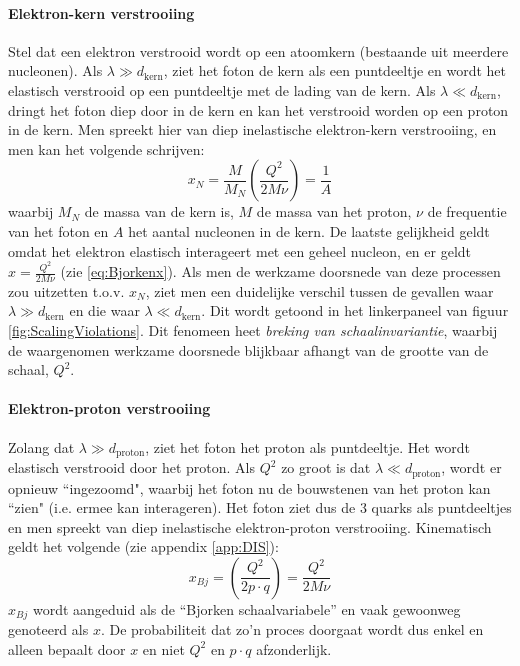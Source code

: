 \documentclass[a4paper,11pt]{article}
\numberwithin{equation}{section} %
\begin{document}
    \paragraph{Elektron-kern verstrooiing}
Stel dat een elektron verstrooid wordt op een atoomkern (bestaande uit meerdere nucleonen).
Als $\lambda \gg d_\text{kern}$, ziet het foton de kern als een puntdeeltje en wordt het elastisch verstrooid op een puntdeeltje met de lading van de kern.
Als $\lambda \ll d_\text{kern}$, dringt het foton diep door in de kern en kan het verstrooid worden op een proton in de kern.
Men spreekt hier van diep inelastische elektron-kern verstrooiing, en men kan het volgende schrijven:
\begin{equation}
x_N = \frac{M}{M_N} \left( \frac{Q^2}{2M\nu} \right) = \frac{1}{A}
\end{equation}
waarbij $M_N$ de massa van de kern is, $M$ de massa van het proton, $\nu$ de frequentie van het foton en $A$ het aantal nucleonen in de kern.
De laatste gelijkheid geldt omdat het elektron elastisch interageert met een geheel nucleon, en er geldt $x = \frac{Q^2}{2M\nu}$ (zie \eqref{eq:Bjorkenx}).
Als men de werkzame doorsnede van deze processen zou uitzetten t.o.v. $x_N$, ziet men een duidelijke verschil tussen de gevallen waar $\lambda \gg d_\text{kern}$ en die waar $\lambda \ll d_\text{kern}$.
Dit wordt getoond in het linkerpaneel van figuur \ref{fig:ScalingViolations}.
Dit fenomeen heet \textit{breking van schaalinvariantie}, waarbij de waargenomen werkzame doorsnede blijkbaar afhangt van de grootte van de schaal, $Q^2$.

      \paragraph{Elektron-proton verstrooiing}
Zolang dat $\lambda \gg d_\text{proton}$, ziet het foton het proton als puntdeeltje. Het wordt elastisch verstrooid door het proton.
Als $Q^2$ zo groot is dat $\lambda \ll d_\text{proton}$, wordt er opnieuw ``ingezoomd", waarbij het foton nu de bouwstenen van het proton kan “zien" (i.e. ermee kan interageren).
Het foton ziet dus de 3 quarks als puntdeeltjes en men spreekt van diep inelastische elektron-proton verstrooiing.
Kinematisch geldt het volgende (zie appendix \ref{app:DIS}):
\begin{equation} \label{eq:Bjorkenx}
x_{Bj} = \left( \frac{Q^2}{2p\cdot q} \right) = \frac{Q^2}{2M\nu}
\end{equation}
$x_{Bj}$ wordt aangeduid als de “Bjorken schaalvariabele” en vaak gewoonweg genoteerd als $x$.
De probabiliteit dat zo’n proces doorgaat wordt dus enkel en alleen bepaalt door $x$ en niet $Q^2$ en $p\cdot q$ afzonderlijk.
\end{document}
